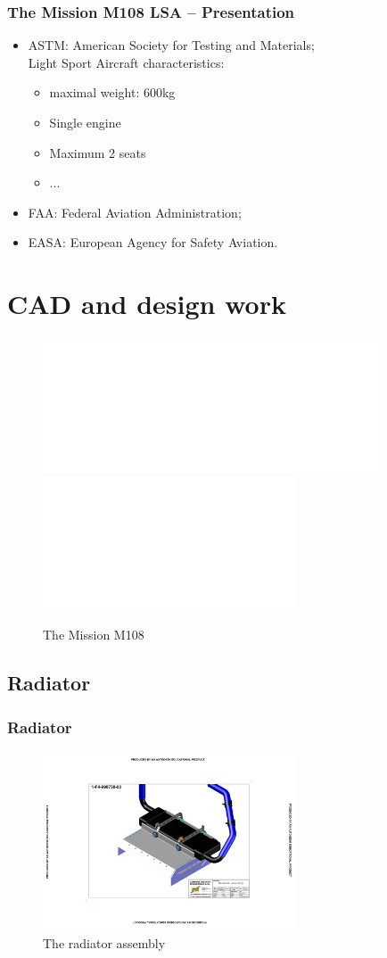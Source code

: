 \documentclass{beamer}
\begin{document}
\begin{frame}\frametitle{The Mission M108 LSA -- Presentation}
  \begin{itemize}
    \item ASTM: American Society for Testing and Materials;\\
Light Sport Aircraft characteristics:
\begin{itemize}
\item maximal weight: 600kg
\item Single engine
\item Maximum 2 seats
\item ...
\end{itemize}
    \item FAA: Federal Aviation Administration;
    \item EASA: European Agency for Safety Aviation.
  \end{itemize}
\end{frame}

\section{CAD and design work}

\begin{frame}
\begin{figure}[ht!]
	\begin{center}
		\includegraphics<1>[width=10cm,trim = 6cm 15cm 10cm 8cm, clip]{pics/M1083D.pdf}
		\includegraphics<2>[width=7.5cm,trim = 30cm 15cm 60cm 45cm, clip]{pics/M1083D.pdf}
		\caption{The Mission M108}
		\label{fig:M1083D}
	\end{center}
\end{figure}
\end{frame}

\subsection{Radiator}

\begin{frame}\frametitle{Radiator}
\begin{figure}[ht!]
	\begin{center}
		\includegraphics[width=7.5cm,trim = 5cm 5cm 5cm 5cm, clip]{pics/PIC008.pdf}
		\caption{The radiator assembly}
		\label{fig:PIC008}
	\end{center}
\end{figure}
\end{frame}
\end{document}
